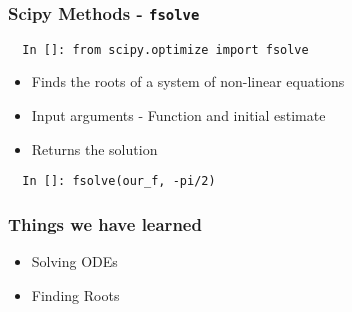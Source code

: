 \documentclass[14pt,compress]{beamer}
\newcommand{\typ}[1]{\lstinline{#1}}
\begin{document}
\begin{frame}[fragile]
\frametitle{Scipy Methods - \typ{fsolve}}
\begin{small}
\begin{lstlisting}
  In []: from scipy.optimize import fsolve
\end{lstlisting}
\end{small}
\begin{itemize}
\item Finds the roots of a system of non-linear equations
\item Input arguments - Function and initial estimate
\item Returns the solution
\end{itemize}
\begin{lstlisting}
  In []: fsolve(our_f, -pi/2)
\end{lstlisting}
\end{frame}




\begin{frame}
  \frametitle{Things we have learned}
  \begin{itemize}
  \item Solving ODEs
  \item Finding Roots
  \end{itemize}
\end{frame}
\end{document}
